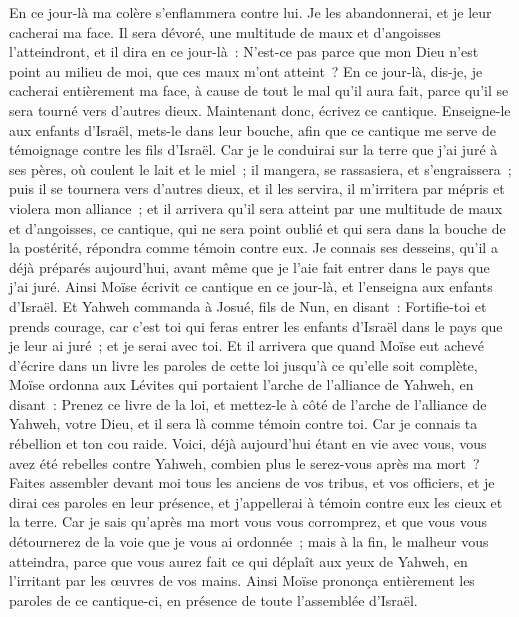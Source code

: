 \begin{multicols}{2}
En ce jour-là ma colère s'enflammera contre lui. Je les abandonnerai, et je leur cacherai ma face. Il sera dévoré, une multitude de maux et d'angoisses l'atteindront, et il dira en ce jour-là~: N'est-ce pas parce que mon Dieu n'est point au milieu de moi, que ces maux m'ont atteint~?
En ce jour-là, dis-je, je cacherai entièrement ma face, à cause de tout le mal qu'il aura fait, parce qu'il se sera tourné vers d'autres dieux.
Maintenant donc, écrivez ce cantique. Enseigne-le aux enfants d'Israël, mets-le dans leur bouche, afin que ce cantique me serve de témoignage contre les fils d'Israël.
Car je le conduirai sur la terre que j'ai juré à ses pères, où coulent le lait et le miel~; il mangera, se rassasiera, et s'engraissera~; puis il se tournera vers d'autres dieux, et il les servira, il m'irritera par mépris et violera mon alliance~;
et il arrivera qu'il sera atteint par une multitude de maux et d'angoisses, ce cantique, qui ne sera point oublié et qui sera dans la bouche de la postérité, répondra comme témoin contre eux. Je connais ses desseins, qu'il a déjà préparés aujourd'hui, avant même que je l'aie fait entrer dans le pays que j'ai juré.
Ainsi Moïse écrivit ce cantique en ce jour-là, et l'enseigna aux enfants d'Israël.
Et Yahweh commanda à Josué, fils de Nun, en disant~: Fortifie-toi et prends courage, car c'est toi qui feras entrer les enfants d'Israël dans le pays que je leur ai juré~; et je serai avec toi.
Et il arrivera que quand Moïse eut achevé d'écrire dans un livre les paroles de cette loi jusqu'à ce qu'elle soit complète,
Moïse ordonna aux Lévites qui portaient l'arche de l'alliance de Yahweh, en disant~:
Prenez ce livre de la loi, et mettez-le à côté de l'arche de l'alliance de Yahweh, votre Dieu, et il sera là comme témoin contre toi.
Car je connais ta rébellion et ton cou raide. Voici, déjà aujourd'hui étant en vie avec vous, vous avez été rebelles contre Yahweh, combien plus le serez-vous après ma mort~?
Faites assembler devant moi tous les anciens de vos tribus, et vos officiers, et je dirai ces paroles en leur présence, et j'appellerai à témoin contre eux les cieux et la terre.
Car je sais qu'après ma mort vous vous corromprez, et que vous vous détournerez de la voie que je vous ai ordonnée~; mais à la fin, le malheur vous atteindra, parce que vous aurez fait ce qui déplaît aux yeux de Yahweh, en l'irritant par les œuvres de vos mains.
Ainsi Moïse prononça entièrement les paroles de ce cantique-ci, en présence de toute l'assemblée d'Israël.

\end{multicols}
